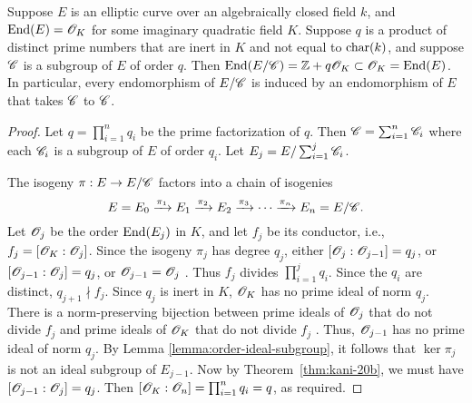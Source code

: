 \documentclass{amsart}
\begin{document}
\begin{lemma}\label{lem:c-end}
  Suppose $E$ is an elliptic curve over an algebraically closed field $k$, and $\operatorname{End}(E) = \mathscr{O}_K$ for some imaginary quadratic field $K$. Suppose $q$ is a product of distinct prime numbers that are inert in $K$ and not equal to $\operatorname{char}(k)$, and suppose $\mathscr{C}$ is a subgroup of $E$ of order $q$. Then $\operatorname{End}(E/\mathscr{C}) = \mathbb{Z} + q\mathscr{O}_K \subset \mathscr{O}_K = \operatorname{End}(E)$. In particular, every endomorphism of $E/\mathscr{C}$ is induced by an endomorphism of $E$ that takes $\mathscr{C}$ to $\mathscr{C}$.
\end{lemma}
\begin{proof}
  Let $q = \prod_{i=1}^n q_i$ be the prime factorization of $q$.
  Then $\mathscr{C} = \sum_{i=1}^n \mathscr{C}_i$ where each $\mathscr{C}_i$ is a subgroup of $E$ of order $q_i$. Let $E_j = E/\sum_{i=1}^j\mathscr{C}_i$.

  The isogeny $\pi: E \to E/\mathscr{C}$ factors into a chain of isogenies
   \[
    E = E_0
    \xrightarrow{\pi_1}
    E_1
    \xrightarrow{\pi_2}
    E_2
    \xrightarrow{\pi_3}
    \cdots
    \xrightarrow{\pi_n}
    E_n = E/\mathscr{C}.
  \]
  Let $\mathscr{O}_j$ be the order $\operatorname{End}(E_j)$ in $K$, and let $f_j$ be its conductor, i.e., $f_j = [\mathscr{O}_{K} : \mathscr{O}_j]$. Since the isogeny $\pi_j$ has degree $q_j$, either $[\mathscr{O}_j : \mathscr{O}_{j-1}] = q_j$, or $[\mathscr{O}_{j-1} : \mathscr{O}_j] = q_j$, or $\mathscr{O}_{j-1} = \mathscr{O}_j$ \cite[Prop.~5]{kohel1996endomorphism}. Thus $f_j$ divides $\prod_{i=1}^{j}q_i$. Since the $q_i$ are distinct, $q_{j+1} \nmid f_j$.
  Since $q_j$ is inert in $K$, $\mathscr{O}_K$ has no prime ideal of norm $q_j$. There is a norm-preserving bijection between prime ideals of $\mathscr{O}_{j}$ that do not divide $f_{j}$ and prime ideals of $\mathscr{O}_K$ that do not divide $f_{j}$ \cite[Prop.~7.20]{cox2011primes}. Thus, $\mathscr{O}_{j-1}$ has no prime ideal of norm $q_j$.
By Lemma \ref{lemma:order-ideal-subgroup}, it follows that $\ker\pi_j$ is not an ideal subgroup of $E_{j-1}$. %
Now by Theorem~\ref{thm:kani-20b}, we must have $[\mathscr{O}_{j-1} : \mathscr{O}_j] = q_j$. Then $[\mathscr{O}_K : \mathscr{O}_n] = \prod_{i=1}^n q_i = q$, as required.
\end{proof}
\end{document}
